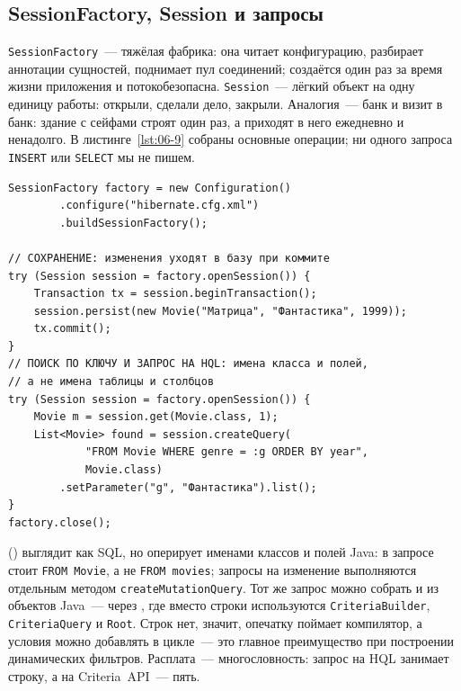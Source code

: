 \subsection{SessionFactory, Session и запросы}

\texttt{SessionFactory}~--- тяжёлая фабрика: она читает конфигурацию,
разбирает аннотации сущностей, поднимает пул соединений; создаётся один раз за
время жизни приложения и потокобезопасна. \texttt{Session}~--- лёгкий объект
на одну единицу работы: открыли, сделали дело, закрыли. Аналогия~--- банк и
визит в банк: здание с сейфами строят один раз, а приходят в него ежедневно и
ненадолго. В листинге~\ref{lst:06-9} собраны основные операции; ни одного
запроса \texttt{INSERT} или \texttt{SELECT} мы не пишем.

\begin{listing}[H]
\begin{verbatim}
SessionFactory factory = new Configuration()
        .configure("hibernate.cfg.xml")
        .buildSessionFactory();

// СОХРАНЕНИЕ: изменения уходят в базу при коммите
try (Session session = factory.openSession()) {
    Transaction tx = session.beginTransaction();
    session.persist(new Movie("Матрица", "Фантастика", 1999));
    tx.commit();
}
// ПОИСК ПО КЛЮЧУ И ЗАПРОС НА HQL: имена класса и полей,
// а не имена таблицы и столбцов
try (Session session = factory.openSession()) {
    Movie m = session.get(Movie.class, 1);
    List<Movie> found = session.createQuery(
            "FROM Movie WHERE genre = :g ORDER BY year",
            Movie.class)
        .setParameter("g", "Фантастика").list();
}
factory.close();
\end{verbatim}
\caption{Операции Hibernate: сохранение, поиск по ключу, запрос на HQL}
\label{lst:06-9}
\end{listing}

 () выглядит как SQL, но оперирует
именами классов и полей Java: в запросе стоит \texttt{FROM Movie}, а не
\texttt{FROM movies}; запросы на изменение выполняются отдельным методом
\texttt{createMutationQuery}. Тот же запрос можно собрать и из объектов
Java~--- через , где вместо строки используются
\texttt{CriteriaBuilder}, \texttt{CriteriaQuery} и \texttt{Root}. Строк нет,
значит, опечатку поймает компилятор, а условия можно добавлять в цикле~--- это
главное преимущество при построении динамических фильтров. Расплата~---
многословность: запрос на HQL занимает строку, а на Criteria~API~--- пять.

